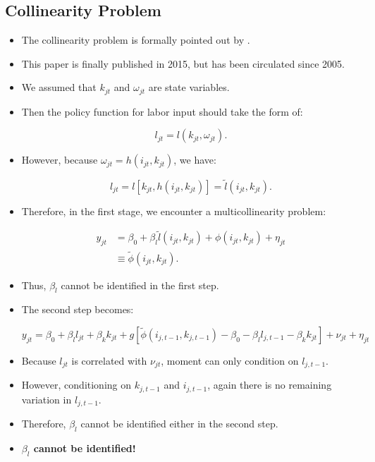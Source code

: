 \documentclass[]{book}
\providecommand{\tightlist}{%
  \setlength{\itemsep}{0pt}\setlength{\parskip}{0pt}}
\begin{document}
\subsection{Collinearity Problem}\label{collinearity-problem}

\begin{itemize}
\tightlist
\item
  The collinearity problem is formally pointed out by
  \citet{Ackerberg2015}.
\item
  This paper is finally published in 2015, but has been circulated since
  2005.
\item
  We assumed that \(k_{jt}\) and \(\omega_{jt}\) are state variables.
\item
  Then the policy function for labor input should take the form of:

  \begin{equation}
  l_{jt} = l(k_{jt}, \omega_{jt}).
  \end{equation}
\item
  However, because \(\omega_{jt} = h(i_{jt}, k_{jt})\), we have:

  \begin{equation}
  l_{jt} = l[k_{jt}, h(i_{jt}, k_{jt})] = \tilde{l}(i_{jt}, k_{jt}).
  \end{equation}
\item
  Therefore, in the first stage, we encounter a multicollinearity
  problem:

  \begin{equation}
  \begin{split}
  y_{jt} &= \beta_0 + \beta_l \tilde{l}(i_{jt}, k_{jt}) + \phi(i_{jt}, k_{jt}) + \eta_{jt}\\
  &\equiv \tilde{\phi}(i_{jt}, k_{jt}).
  \end{split}
  \end{equation}
\item
  Thus, \(\beta_l\) cannot be identified in the first step.
\item
  The second step becomes:

  \begin{equation}
  y_{jt} = \beta_0 + \beta_l l_{jt} + \beta_k k_{jt} + g[\tilde{\phi}(i_{j, t - 1}, k_{j, t - 1}) - \beta_0 - \beta_l l_{j, t - 1} - \beta_k k_{jt}] + \nu_{jt} + \eta_{jt}
  \end{equation}
\item
  Because \(l_{jt}\) is correlated with \(\nu_{jt}\), moment can only
  condition on \(l_{j, t - 1}\).
\item
  However, conditioning on \(k_{j, t - 1}\) and \(i_{j, t - 1}\), again
  there is no remaining variation in \(l_{j, t - 1}\).
\item
  Therefore, \(\beta_l\) cannot be identified either in the second step.
\item
  \textbf{\(\beta_l\) cannot be identified!}
\end{itemize}
\end{document}
